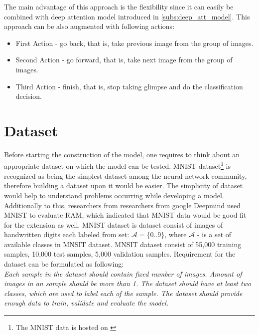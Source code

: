 {The main advantage of this approach is the flexibility since it can easily be combined
with deep attention model introduced in \autoref{subs:deep_att_model}. This
approach can be also augmented with following actions:
\begin{itemize}
	\item First Action - go back, that is, take previous image from the group of images.
	\item Second Action - go forward, that is, take next image from the group of images.
	\item Third Action - finish, that is, stop taking glimpse and do the classification decision.
\end{itemize}


\section{Dataset}
\label{sec:analysis_dataset}

Before starting the construction of the model, one requires to think about an appropriate
dataset on which the model can be tested.
MNIST dataset\footnote{The MNIST data is hosted on \cite{LeCun2010}} is recognized as being the simplest dataset among the neural network
community, therefore building a dataset upon it would be easier. The simplicity of dataset
would help to understand problems occurring while developing a model.
Additionally to this, researchers from researchers from google
Deepmind used MNIST to evaluate RAM, which indicated that MNIST data would
be good fit for the extension as well. \cite{DBLP:journals/corr/MnihHGK14}
MNIST dataset is dataset consist of images of handwritten digits each labeled
from set: $\mathcal{A} = \{0 .. 9\}$, where $\mathcal{A}$ - is a set of available
classes in MNSIT dataset.
MNSIT dataset consist of 55,000 training samples, 10,000 test samples, 5,000 validation samples.
Requirement for the dataset can be formulated as following:\\
\textit{Each sample in the dataset should contain fixed number of images. Amount of images
in an sample should be more than 1. The dataset should have at least two classes,
which are used to label each of the sample. The dataset should provide enough
data to train, validate and evaluate the model.}



}
